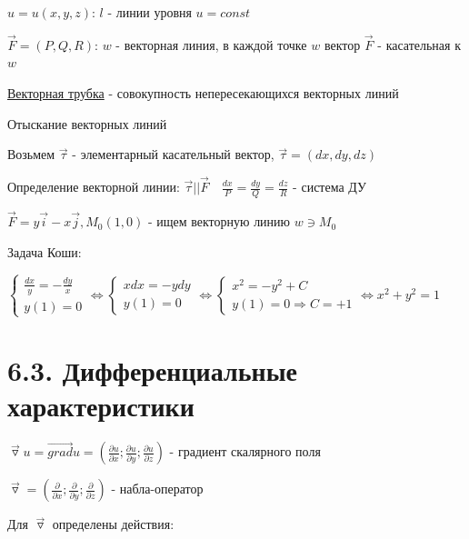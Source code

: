 \documentclass[12pt]{article}
\begin{document}
    $u = u(x, y, z)$: $l$ - линии уровня $u = const$

    $\overrightarrow{F} = (P, Q, R)$: $w$ - векторная линия, в каждой точке $w$ вектор $\overrightarrow{F}$ - касательная к $w$

    \underline{Векторная трубка} - совокупность непересекающихся векторных линий

    \Nota Отыскание векторных линий

    Возьмем $\overrightarrow{\tau}$ - элементарный касательный вектор, $\overrightarrow{\tau} = (dx, dy, dz)$

    Определение векторной линии: $\overrightarrow{\tau} || \overrightarrow{F} \quad \frac{dx}{P} = \frac{dy}{Q} = \frac{dz}{R}$ - система ДУ

    \Ex $\overrightarrow{F} = y \overrightarrow{i} - x \overrightarrow{j}, M_0 (1, 0)$ - ищем векторную линию $w \ni M_0$

    Задача Коши:

    $\begin{cases}
         \frac{dx}{y} = -\frac{dy}{x} \\
         y(1) = 0
    \end{cases} \Longleftrightarrow \begin{cases}
                                        xdx = -ydy \\
                                        y(1) = 0
    \end{cases} \Longleftrightarrow \begin{cases}
                                        x^2 = -y^2 + C \\
                                        y(1) = 0 \Longrightarrow C = +1
    \end{cases} \Longleftrightarrow x^2 + y^2 = 1 $


    \section{6.3. Дифференциальные характеристики}

    \Mems $\overrightarrow{\triangledown}u = \overrightarrow{grad}u = \left(\frac{\partial u}{\partial x}; \frac{\partial u}{\partial y}; \frac{\partial u}{\partial z}\right)$ - градиент скалярного поля

    $\overrightarrow{\triangledown} = \left(\frac{\partial}{\partial x}; \frac{\partial}{\partial y}; \frac{\partial}{\partial z}\right)$ - набла-оператор

    \Nota Для $\overrightarrow{\triangledown}$ определены действия:
\end{document}
